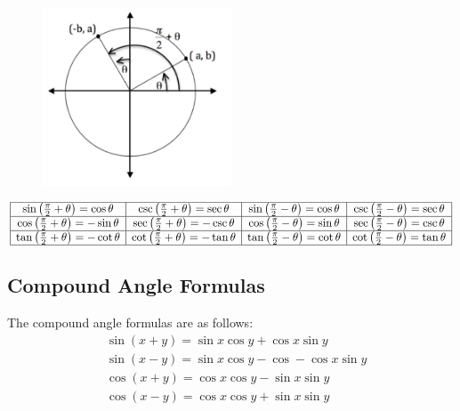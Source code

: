 \documentclass{article}
\begin{document}
\begin{figure}[ht]
    \centering
    \includegraphics[width=0.5\textwidth]{imgs/circle equivalent.PNG}
\end{figure}
\begin{center}
\centering
$$
\begin{array}{|c|c|c|c|}
\hline \sin \left(\frac{\pi}{2}+\theta\right)=\cos \theta & \csc \left(\frac{\pi}{2}+\theta\right)=\sec \theta & \sin \left(\frac{\pi}{2}-\theta\right)=\cos \theta & \csc \left(\frac{\pi}{2}-\theta\right)=\sec \theta \\
\hline \cos \left(\frac{\pi}{2}+\theta\right)=-\sin \theta & \sec \left(\frac{\pi}{2}+\theta\right)=-\csc \theta & \cos \left(\frac{\pi}{2}-\theta\right)=\sin \theta & \sec \left(\frac{\pi}{2}-\theta\right)=\csc \theta \\
\hline \tan \left(\frac{\pi}{2}+\theta\right)=-\cot \theta & \cot \left(\frac{\pi}{2}+\theta\right)=-\tan \theta & \tan \left(\frac{\pi}{2}-\theta\right)=\cot \theta & \cot \left(\frac{\pi}{2}-\theta\right)=\tan \theta \\
\hline
\end{array}
$$
\end{center}

\subsection{Compound Angle Formulas}

The compound angle formulas are as follows:
\begin{align*}
& \sin(x+y)=\sin x \cos y+\cos x \sin y\\
& \sin (x-y)=\sin x\cos y-\cos-\cos x \sin y\\
& \cos(x+y)=\cos x\cos y -\sin x \sin y\\
&\cos (x-y)=\cos x \cos y+\sin x \sin y
\end{align*}
\end{document}
